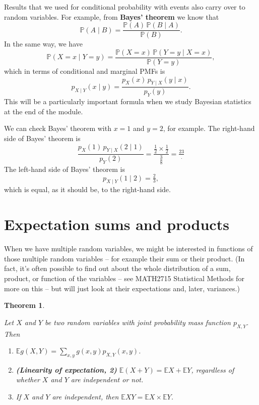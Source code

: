 \documentclass[
  a4paper,
]{book}
\providecommand{\tightlist}{%
  \setlength{\itemsep}{0pt}\setlength{\parskip}{0pt}}
\newtheorem{theorem}{Theorem}[chapter]
\theoremstyle{definition}
\theoremstyle{definition}
\theoremstyle{definition}
\theoremstyle{definition}
\theoremstyle{remark}
\begin{document}
Results that we used for conditional probability with events also carry over to random variables. For example, from \textbf{Bayes' theorem} we know that
\[ \mathbb P(A \mid B) = \frac{ \mathbb P(A) \, \mathbb P(B \mid A)}{\mathbb P(B)} . \]
In the same way, we have
\[ \mathbb P(X = x \mid Y = y) = \frac{ \mathbb P(X = x) \, \mathbb P(Y = y \mid X = x)}{\mathbb P(Y = y)} , \]
which in terms of conditional and marginal PMFs is
\[ p_{X \mid Y}(x \mid y) = \frac{p_X(x) \, p_{Y \mid X}(y \mid x)}{p_Y(y)} . \]
This will be a particularly important formula when we study Bayesian statistics at the end of the module.

We can check Bayes' theorem with \(x = 1\) and \(y = 2\), for example.
The right-hand side of Bayes' theorem is
\[ \frac{p_X(1) \, p_{Y \mid X}(2 \mid 1)}{p_Y(2)} = \frac{\frac12 \times \frac12}{\frac38} = \tfrac{23} .   \]
The left-hand side of Bayes' theorem is
\[ p_{X \mid Y}(1 \mid 2) = \tfrac23 , \]
which is equal, as it should be, to the right-hand side.

\hypertarget{sum-product}{%
\section{Expectation sums and products}\label{sum-product}}

When we have multiple random variables, we might be interested in functions of those multiple random variables -- for example their sum or their product. (In fact, it's often possible to find out about the whole distribution of a sum, product, or function of the variables -- see MATH2715 Statistical Methods for more on this -- but will just look at their expectations and, later, variances.)

\begin{theorem}
\protect\hypertarget{thm:linearity2}{}\label{thm:linearity2}

Let \(X\) and \(Y\) be two random variables with joint probability mass function \(p_{X,Y}\). Then

\begin{enumerate}
\def\labelenumi{\arabic{enumi}.}
\tightlist
\item
  \(\mathbb Eg(X,Y) = \displaystyle\sum_{x,y} g(x,y) p_{X,Y}(x,y)\).
\item
  \textbf{(Linearity of expectation, 2)} \(\mathbb E(X + Y) = \mathbb EX + \mathbb EY\), regardless of whether \(X\) and \(Y\) are independent or not.
\item
  If \(X\) and \(Y\) are independent, then \(\mathbb EXY = \mathbb EX \times \mathbb EY\).
\end{enumerate}

\end{theorem}
\end{document}
